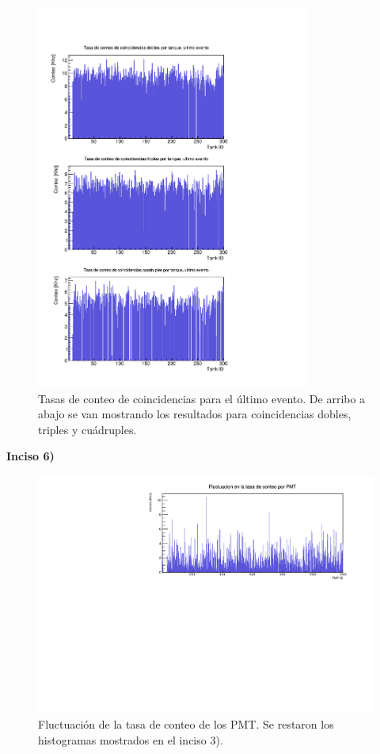 \documentclass[11pt]{article}
\begin{document}
\begin{figure}[H]
\centering
\includegraphics[width=0.8\textwidth]{../Figuras/Prob5UltimoEvento.pdf}
\caption{Tasas de conteo de coincidencias para el último evento. De arribo a abajo se van mostrando los resultados para coincidencias dobles, triples y cuádruples.}
\label{fig:Prob5-2}
\end{figure}


\textbf{Inciso 6)}


\begin{figure}[H]
\centering
\includegraphics[width=1\textwidth]{../Figuras/Fluctuaciones.pdf}
\caption{Fluctuación de la tasa de conteo de los PMT. Se restaron los histogramas mostrados en el inciso 3).}
\label{fig:Prob6}
\end{figure}
\end{document}
